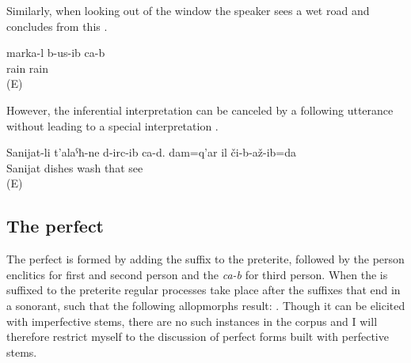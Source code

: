 Similarly, when looking out of the window the speaker sees a wet road and concludes from this .
%
\begin{exe}
	\ex	\label{ex:It has rained analytic}
	\gll	marka-l	b-us-ib	ca-b\\
		rain	rain	\\
	\glt	{} (E)
\end{exe}

However, the inferential interpretation can be canceled by a following utterance without leading to a special interpretation .
%
\begin{exe}
	\ex	\label{ex:Sanijat has washed the dishes. I saw it myself}
	\gll	Sanijat-li 	t'alaˁħ-ne	d-irc-ib ca-d.	dam=q'ar	il	či-b-až-ib=da\\
		Sanijat	dishes	wash 		that	see\\
	\glt	{} (E)
\end{exe}





\subsection{The perfect}
\label{ssec:The perfect}

The perfect is formed by adding the  suffix to the preterite, followed by the person enclitics for first and second person and the  \textit{ca-b} for third person. When the  is suffixed to the preterite regular  processes take place after the suffixes that end in a sonorant, such that the following allopmorphs result: . Though it can be elicited with imperfective stems, there are no such instances in the corpus and I will therefore restrict myself to the discussion of perfect forms built with perfective stems.

